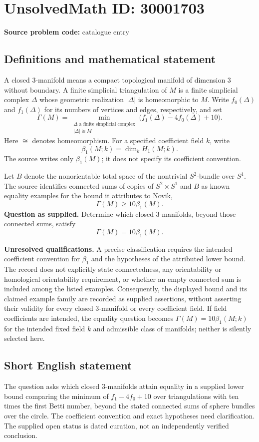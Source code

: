 \documentclass[11pt]{article}
\begin{document}
\section*{UnsolvedMath ID: 30001703}
\textbf{Source problem code:} catalogue entry
\subsection{Definitions and mathematical statement}
A closed \(3\)-manifold means a compact topological manifold of dimension \(3\) without boundary. A finite simplicial triangulation of \(M\) is a finite simplicial complex \(\Delta\) whose geometric realization \(|\Delta|\) is homeomorphic to \(M\). Write \(f_0(\Delta)\) and \(f_1(\Delta)\) for its numbers of vertices and edges, respectively, and set
\[
\Gamma(M)=\min_{\substack{\Delta\text{ a finite simplicial complex}\\ |\Delta|\cong M}}
\bigl(f_1(\Delta)-4f_0(\Delta)+10\bigr).
\]
Here \(\cong\) denotes homeomorphism. For a specified coefficient field \(k\), write
\[
\beta_1(M;k)=\dim_k H_1(M;k).
\]
The source writes only \(\beta_1(M)\); it does not specify its coefficient convention.

Let \(B\) denote the nonorientable total space of the nontrivial \(S^2\)-bundle over \(S^1\). The source identifies connected sums of copies of \(S^2\times S^1\) and \(B\) as known equality examples for the bound it attributes to Novik,
\[
\Gamma(M)\geq 10\beta_1(M).
\]
\textbf{Question as supplied.} Determine which closed \(3\)-manifolds, beyond those connected sums, satisfy
\[
\Gamma(M)=10\beta_1(M).
\]

\textbf{Unresolved qualifications.} A precise classification requires the intended coefficient convention for \(\beta_1\) and the hypotheses of the attributed lower bound. The record does not explicitly state connectedness, any orientability or homological orientability requirement, or whether an empty connected sum is included among the listed examples. Consequently, the displayed bound and its claimed example family are recorded as supplied assertions, without asserting their validity for every closed \(3\)-manifold or every coefficient field. If field coefficients are intended, the equality question becomes \(\Gamma(M)=10\beta_1(M;k)\) for the intended fixed field \(k\) and admissible class of manifolds; neither is silently selected here.
\subsection{Short English statement}
The question asks which closed \(3\)-manifolds attain equality in a supplied lower bound comparing the minimum of \(f_1-4f_0+10\) over triangulations with ten times the first Betti number, beyond the stated connected sums of sphere bundles over the circle. The coefficient convention and exact hypotheses need clarification. The supplied open status is dated curation, not an independently verified conclusion.
\end{document}
